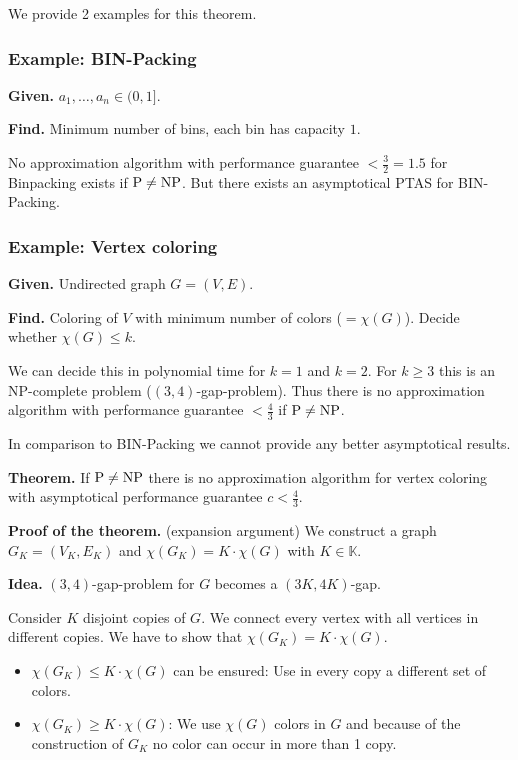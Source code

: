 \documentclass[a4paper]{article}
\newcommand{\given}[1]{\textbf{Given.} #1\par}
\newcommand{\find}[1]{\textbf{Find.} #1\par}
\newcommand{\cls}[1]{\rm{#1}}
\newenvironment{spec}[0]{\begin{framed}}{\end{framed}}
\begin{document}
We provide 2 examples for this theorem.

\subsubsection{Example: BIN-Packing}
%
\begin{spec}
  \given{$a_1,\ldots,a_n \in (0,1]$.}
  \find{Minimum number of bins, each bin has capacity $1$.}
\end{spec}

No approximation algorithm with performance guarantee $< \frac32 = 1.5$
for Binpacking exists if $\cls{P} \neq \cls{NP}$.
But there exists an asymptotical PTAS for BIN-Packing.

\subsubsection{Example: Vertex coloring}
%
\begin{spec}
  \given{Undirected graph $G = (V, E)$.}
  \find{Coloring of $V$ with minimum number of colors ($=\chi(G)$). Decide whether $\chi(G) \leq k$.}
\end{spec}

We can decide this in polynomial time for $k=1$ and $k=2$.
For $k\geq 3$ this is an \cls{NP}-complete problem ($(3, 4)$-gap-problem).
Thus there is no approximation algorithm with performance guarantee
$< \frac43$ if $\cls{P} \neq \cls{NP}$.

In comparison to BIN-Packing we cannot provide any better asymptotical
results.

\textbf{Theorem.}
  If $\cls{P} \neq \cls{NP}$ there is no approximation algorithm for vertex coloring
  with asymptotical performance guarantee $c < \frac43$.

\textbf{Proof of the theorem.} (expansion argument)
We construct a graph $G_K = (V_K, E_K)$ and $\chi(G_K) = K \cdot \chi(G)$
with $K \in \mathbb{K}$.

\textbf{Idea.}
$(3,4)$-gap-problem for $G$ becomes a $(3K, 4K)$-gap.

Consider $K$ disjoint copies of $G$. We connect every vertex with all vertices
in different copies. We have to show that $\chi(G_K) = K \cdot \chi(G)$.
\begin{itemize}
  \item $\chi(G_K) \leq K \cdot \chi(G)$ can be ensured:
        Use in every copy a different set of colors.
  \item $\chi(G_K) \geq K \cdot \chi(G)$:
        We use $\chi(G)$ colors in $G$ and because of the construction of $G_K$
        no color can occur in more than 1 copy.
\end{itemize}
\end{document}
